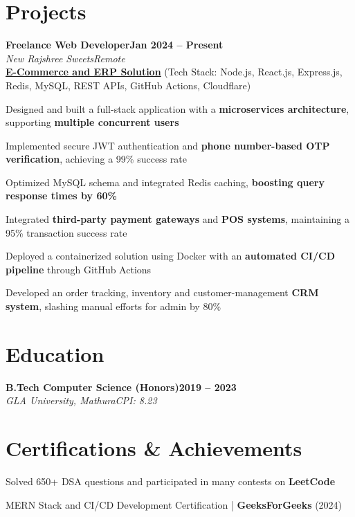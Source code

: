 \documentclass[letterpaper, 10pt]{article}
\newcommand{\heading}[2]{ \hspace{5pt}#1\hfill#2\\[1pt] }
\newcommand{\headingBf}[2]{ \heading{\textbf{#1}}{\textbf{#2}} }
\newcommand{\headingIt}[2]{ \heading{\textit{#1}}{\textit{#2}} }
\newenvironment{resume_list}{
\vspace{-3pt}
\begin{itemize}[itemsep=0.5pt, parsep=0.5pt, leftmargin=18pt] }{ \end{itemize}
\vspace{-3pt}
}
\begin{document}
\section{Projects}
\headingBf{Freelance Web Developer}{Jan 2024 -- Present}
\headingIt{New Rajshree Sweets}{Remote}
\hspace{10pt}\textbf{\href{https://newrajshreesweets.com}{\underline{E-Commerce and ERP Solution}}}
\small{(Tech Stack: Node.js, React.js, Express.js, Redis, MySQL, REST APIs, GitHub Actions, Cloudflare)}
\begin{resume_list}
    \item Designed and built a full-stack application with a \textbf{microservices architecture}, supporting \textbf{multiple concurrent users}
    \item Implemented secure JWT authentication and \textbf{phone number-based OTP verification}, achieving a 99\% success rate
    \item Optimized MySQL schema and integrated Redis caching, \textbf{boosting query response times by 60\%}
    \item Integrated \textbf{third-party payment gateways} and \textbf{POS systems}, maintaining a 95\% transaction success rate
    \item Deployed a containerized solution using Docker with an \textbf{automated CI/CD pipeline} through GitHub Actions
    \item Developed an order tracking, inventory and customer-management \textbf{CRM system}, slashing manual efforts for admin by 80\%
\end{resume_list}

\section{Education}
\headingBf{B.Tech Computer Science (Honors)}{2019 -- 2023}
\headingIt{GLA University, Mathura}{CPI: 8.23}

\section{Certifications \& Achievements}
\begin{resume_list}
    \item Solved 650+ DSA questions and participated in many contests on \textbf{LeetCode} \href{https://leetcode.com/u/KeshariPiyush24/}{\faLink}
    \item MERN Stack and CI/CD Development Certification | \textbf{GeeksForGeeks} (2024) \href{https://media.geeksforgeeks.org/certificates/1706532819/013b39c1dda8d49bf888496b0d0d6b1b.pdf}{\faLink}
\end{resume_list}
\end{document}
